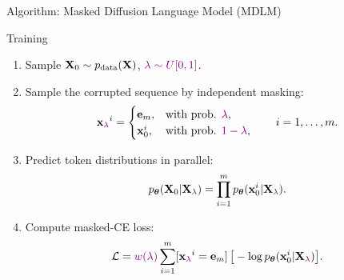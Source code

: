 \documentclass{beamer}
\begin{document}
\begin{frame}{Algorithm: Masked Diffusion Language Model (MDLM)}

	\begin{block}{Training}
		\begin{enumerate}
			\item Sample $\mathbf{X}_0 \sim p_{\text{data}}(\mathbf{X})$, ${\color{violet}\lambda \sim U[0, 1]}$.
			\item Sample the corrupted sequence by independent masking:
			\vspace{-0.3cm}
			\[
				\mathbf{x}_{\color{violet}\lambda}^i =
				\begin{cases}
					\mathbf{e}_m, & \text{with prob. }{\color{violet}\lambda},\\
					\mathbf{x}_0^i, & \text{with prob. }{\color{violet}1-\lambda},
				\end{cases}
				\qquad i=1,\dots,m.
			\]
			\vspace{-0.5cm}
			\item Predict token distributions in parallel:
			\vspace{-0.3cm}
			\[
				p_{\boldsymbol{\theta}}(\mathbf{X}_0 | \mathbf{X}_{\color{violet}\lambda})
				=
				\prod_{i=1}^m p_{\boldsymbol{\theta}}(\mathbf{x}_0^i | \mathbf{X}_{\color{violet}\lambda}).
			\]
			\vspace{-0.5cm}
			\item Compute masked-CE loss:
			\vspace{-0.3cm}
			\[
				\mathcal{L}
				=
				{\color{violet}w(\lambda)} \sum_{i=1}^m [\mathbf{x}_{\color{violet}\lambda}^i=\mathbf{e}_m]\,
				\big[-\log p_{\boldsymbol{\theta}}(\mathbf{x}_0^i | \mathbf{X}_{\color{violet}\lambda})\big].
			\]
		\end{enumerate}
	\end{block}

\end{frame}
\end{document}
